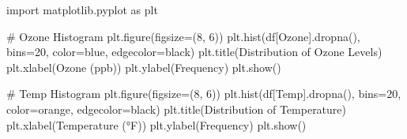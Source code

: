 \documentclass[
  letterpaper,
  DIV=11,
  numbers=noendperiod]{scrreprt}
\newenvironment{Shaded}{\begin{snugshade}}{\end{snugshade}}
\newcommand{\CommentTok}[1]{\textcolor[rgb]{0.37,0.37,0.37}{#1}}
\newcommand{\DecValTok}[1]{\textcolor[rgb]{0.68,0.00,0.00}{#1}}
\newcommand{\ImportTok}[1]{\textcolor[rgb]{0.00,0.46,0.62}{#1}}
\newcommand{\NormalTok}[1]{\textcolor[rgb]{0.00,0.23,0.31}{#1}}
\newcommand{\OperatorTok}[1]{\textcolor[rgb]{0.37,0.37,0.37}{#1}}
\newcommand{\StringTok}[1]{\textcolor[rgb]{0.13,0.47,0.30}{#1}}
\begin{document}
\begin{Shaded}
\begin{Highlighting}[]
\ImportTok{import}\NormalTok{ matplotlib.pyplot }\ImportTok{as}\NormalTok{ plt}

\CommentTok{\# Ozone Histogram}
\NormalTok{plt.figure(figsize}\OperatorTok{=}\NormalTok{(}\DecValTok{8}\NormalTok{, }\DecValTok{6}\NormalTok{))}
\NormalTok{plt.hist(df[}\StringTok{\textquotesingle{}Ozone\textquotesingle{}}\NormalTok{].dropna(), bins}\OperatorTok{=}\DecValTok{20}\NormalTok{, color}\OperatorTok{=}\StringTok{\textquotesingle{}blue\textquotesingle{}}\NormalTok{, edgecolor}\OperatorTok{=}\StringTok{\textquotesingle{}black\textquotesingle{}}\NormalTok{)}
\NormalTok{plt.title(}\StringTok{\textquotesingle{}Distribution of Ozone Levels\textquotesingle{}}\NormalTok{)}
\NormalTok{plt.xlabel(}\StringTok{\textquotesingle{}Ozone (ppb)\textquotesingle{}}\NormalTok{)}
\NormalTok{plt.ylabel(}\StringTok{\textquotesingle{}Frequency\textquotesingle{}}\NormalTok{)}
\NormalTok{plt.show()}

\CommentTok{\# Temp Histogram}
\NormalTok{plt.figure(figsize}\OperatorTok{=}\NormalTok{(}\DecValTok{8}\NormalTok{, }\DecValTok{6}\NormalTok{))}
\NormalTok{plt.hist(df[}\StringTok{\textquotesingle{}Temp\textquotesingle{}}\NormalTok{].dropna(), bins}\OperatorTok{=}\DecValTok{20}\NormalTok{, color}\OperatorTok{=}\StringTok{\textquotesingle{}orange\textquotesingle{}}\NormalTok{, edgecolor}\OperatorTok{=}\StringTok{\textquotesingle{}black\textquotesingle{}}\NormalTok{)}
\NormalTok{plt.title(}\StringTok{\textquotesingle{}Distribution of Temperature\textquotesingle{}}\NormalTok{)}
\NormalTok{plt.xlabel(}\StringTok{\textquotesingle{}Temperature (°F)\textquotesingle{}}\NormalTok{)}
\NormalTok{plt.ylabel(}\StringTok{\textquotesingle{}Frequency\textquotesingle{}}\NormalTok{)}
\NormalTok{plt.show()}
\end{Highlighting}
\end{Shaded}
\end{document}

